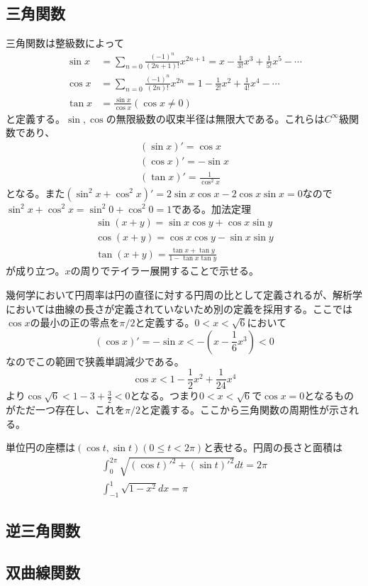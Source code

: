 \subsection{三角関数}
	三角関数は整級数によって
	\begin{align*}
		\sin x &= \sum_{n = 0} \frac{(-1)^n}{(2n + 1)!}x^{2n + 1} = x - \frac{1}{3!}x^3 + \frac{1}{5!}x^5 - \cdots\\
		\cos x &= \sum_{n = 0} \frac{(-1)^n}{(2n)!}x^{2n} = 1 - \frac{1}{2!}x^2 + \frac{1}{4!}x^4 - \cdots\\
		\tan x &= \frac{\sin x}{\cos x} (\cos x \neq 0)
	\end{align*}
	と定義する。$\sin, \cos$の無限級数の収束半径は無限大である。これらは$C^\infty$級関数であり、
	\begin{align*}
		(\sin x)' = \cos x\\
		(\cos x)' = -\sin x\\
		(\tan x)' = \frac{1}{\cos^2 x}
	\end{align*}
	となる。また$(\sin^2 x + \cos^2 x)' = 2\sin x\cos x - 2\cos x\sin x = 0$なので$\sin^2 x + \cos^2 x = \sin^2 0 + \cos^2 0 = 1$である。加法定理
	\begin{align*}
		\sin(x + y) = \sin x\cos y + \cos x\sin y\\
		\cos(x + y) = \cos x\cos y - \sin x\sin y\\
		\tan(x + y) = \frac{\tan x + \tan y}{1 - \tan x\tan y}
	\end{align*}
	が成り立つ。$x$の周りでテイラー展開することで示せる。

	幾何学において円周率は円の直径に対する円周の比として定義されるが、解析学においては曲線の長さが定義されていないため別の定義を採用する。ここでは$\cos x$の最小の正の零点を$\pi/2$と定義する。$0 < x < \sqrt{6}$において
		\[(\cos x)' = -\sin x < - (x - \frac{1}{6}x^3) < 0\]
	なのでこの範囲で狭義単調減少である。
		\[\cos x < 1 - \frac{1}{2}x^2 + \frac{1}{24}x^4\]
	より$\cos \sqrt{6} < 1 - 3 + \frac{3}{2} < 0$となる。つまり$0 < x < \sqrt{6}$で$\cos x = 0$となるものがただ一つ存在し、これを$\pi/2$と定義する。ここから三角関数の周期性が示される。

	単位円の座標は$(\cos t, \sin t)(0 \leq t < 2\pi)$と表せる。円周の長さと面積は
	\begin{align*}
		\int_0^{2\pi} \sqrt{(\cos t)'^2 + (\sin t)'^2}dt = 2\pi\\
		\int_{-1}^1 \sqrt{1 - x^2}dx = \pi
	\end{align*}

\subsection{逆三角関数}
\subsection{双曲線関数}